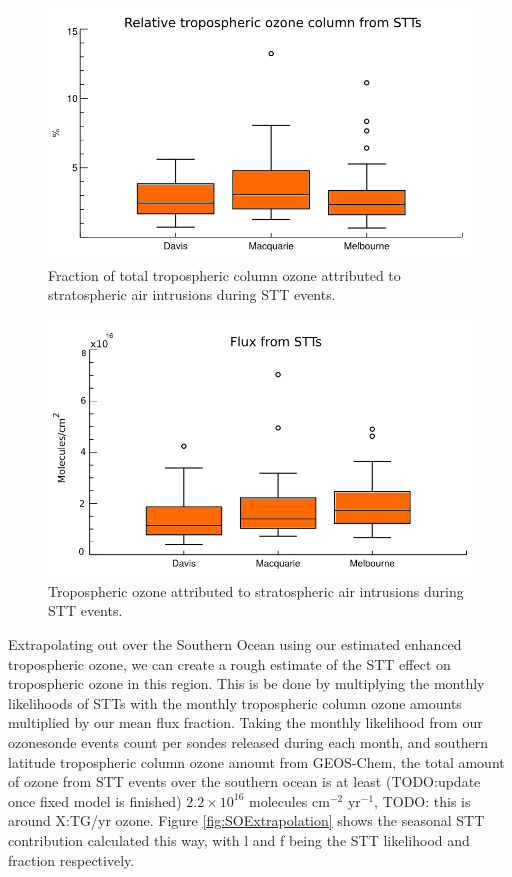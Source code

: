 \documentclass{article}
\begin{document}
  \begin{figure}[!htbp]
    \begin{center}
    \includegraphics[width=0.8\columnwidth]{figures/flux_relative.png}
    \caption{Fraction of total tropospheric column ozone attributed to stratospheric air intrusions during STT events.}
    \label{fig:fluxsummary}
    \end{center}
  \end{figure}
  \begin{figure}[!htbp]
    \begin{center}
    \includegraphics[width=0.8\columnwidth]{figures/flux_absolute.png}
    \caption{Tropospheric ozone attributed to stratospheric air intrusions during STT events.}
    \label{fig:fluxsummaryabs}
    \end{center}
  \end{figure}
  
  Extrapolating out over the Southern Ocean using our estimated enhanced tropospheric ozone, we can create a rough estimate of the STT effect on tropospheric ozone in this region.
  This is be done by multiplying the monthly likelihoods of STTs with the monthly tropospheric column ozone amounts multiplied by our mean flux fraction.
  Taking the monthly likelihood from our ozonesonde events count per sondes released during each month, and southern latitude tropospheric column ozone amount from GEOS-Chem, the total amount of ozone from STT events over the southern ocean is at least (TODO:update once fixed model is finished) $2.2\times10^{16}$ molecules cm$^{-2}$ yr$^{-1}$, TODO: this is around X:TG/yr ozone.
  Figure \ref{fig:SOExtrapolation} shows the seasonal STT contribution calculated this way, with l and f being the STT likelihood and fraction respectively.
    
\end{document}
